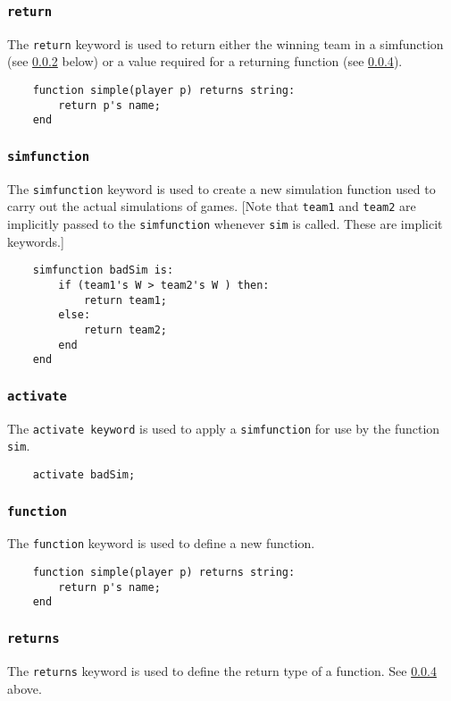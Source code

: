 \subsubsection{\texttt{return}}
The \texttt{return} keyword is used to return either the winning team in a simfunction (see \ref{simfunction} below) or a value required for a returning function (see \ref{function}).
\begin{verbatim}
    function simple(player p) returns string:
        return p's name;
    end
\end{verbatim}

\subsubsection{\texttt{simfunction}} \label{simfunction}
The \texttt{simfunction} keyword is used to create a new simulation function used to carry out the actual simulations of games. [Note that \texttt{team1} and \texttt{team2} are implicitly passed to the \texttt{simfunction} whenever \texttt{sim} is called. These are implicit keywords.]
\begin{verbatim}
    simfunction badSim is:
        if (team1's W > team2's W ) then:
            return team1;
        else:
            return team2;
        end
    end

\end{verbatim}

\subsubsection{\texttt{activate}}\label{activate}
The \texttt{activate keyword} is used to apply a \texttt{simfunction} for use by the function \texttt{sim}.
\begin{verbatim}
    activate badSim;
\end{verbatim} 

\subsubsection{\texttt{function}} \label{function}
The \texttt{function} keyword is used to define a new function.
\begin{verbatim}
    function simple(player p) returns string:
        return p's name;
    end
\end{verbatim}

\subsubsection{\texttt{returns}}\label{returns}
The \texttt{returns} keyword is used to define the return type of a function. See \ref{function} above.

